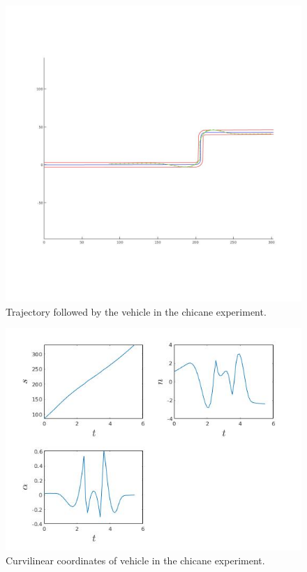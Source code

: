 \documentclass[conference,11pt]{IEEEtran}
\begin{document}
\begin{figure}[t]
  \centering
  \includegraphics[scale=0.25]{chicane.jpg}
  \caption{Trajectory followed by the vehicle in the chicane experiment.}
  \label{fig:chicane}
\end{figure}
\begin{figure}[b]
  \centering
  \includegraphics[scale=0.5]{chicane_curv.jpg}
  \caption{Curvilinear coordinates of vehicle in the chicane experiment.}
  \label{fig:chicane_curv}
\end{figure}
\end{document}
